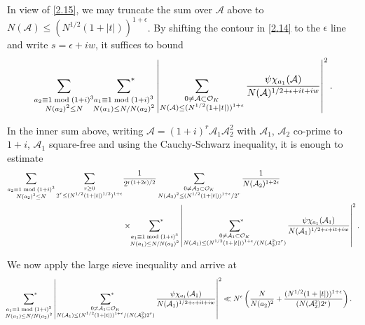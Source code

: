 \documentclass[twoside,leqno,10pt, A4]{amsart}
\begin{document}
     In view of \eqref{2.15}, we may truncate the sum over $\mathcal{A}$ above to $N(\mathcal{A}) \leq (N^{1/2}(1+|t|))^{1+\epsilon}$. By shifting the contour in \eqref{2.14} to the $\epsilon$ line and write $s=\epsilon+iw$, it suffices to bound
\begin{align*}
    \sum_{\substack{a_2 \equiv 1 \bmod {(1+i)^3} \\ N(a_2)^2 \leq N}}\sideset{}{^*}\sum_{\substack{a_1 \equiv 1 \bmod {(1+i)^3} \\ N(a_1) \leq N/N(a_2)^2}} \left| \sum_{\substack {0 \neq \mathcal{A} \subset
  \mathcal{O}_K \\ N(\mathcal{A}) \leq (N^{1/2}(1+|t|))^{1+\epsilon}}}\frac{\psi\chi_{a_1}(\mathcal{A})}{N(\mathcal{A})^{1/2+\epsilon+it+iw}} \right|^2.
\end{align*}

    In the inner sum above, writing $\mathcal{A}=(1+i)^r\mathcal{A}_1\mathcal{A}^2_2$ with $\mathcal{A}_1$, $\mathcal{A}_2$ co-prime to $1+i$, $\mathcal{A}_1$ square-free and using the Cauchy-Schwarz inequality, it is enough to estimate
\begin{align*}
   \sum_{\substack{a_2 \equiv 1 \bmod {(1+i)^3} \\ N(a_2)^2 \leq N}}  \sum_{\substack {r \geq 0\\ 2^r \leq (N^{1/2}(1+|t|)^{1/2})^{1+\epsilon}}} & \frac {1}{2^{r(1+2\epsilon)/2}} \sum_{\substack {0 \neq \mathcal{A}_2 \subset
  \mathcal{O}_K \\ N(\mathcal{A}_2)^2 \leq (N^{1/2}(1+|t|))^{1+\epsilon}/2^r}}\frac{1}{N(\mathcal{A}_2)^{1+2\epsilon}} \\
  &\times \sideset{}{^*}\sum_{\substack{a_1 \equiv 1 \bmod {(1+i)^3} \\ N(a_1) \leq N/N(a_2)^2}} \left| \ \sideset{}{^*}\sum_{\substack {0 \neq \mathcal{A}_1 \subset
  \mathcal{O}_K \\ N(\mathcal{A}_1) \leq (N^{1/2}(1+|t|))^{1+\epsilon}/(N(\mathcal{A}^2_2)2^r)}}\frac{\psi\chi_{a_1}(\mathcal{A}_1)}{N(\mathcal{A}_1)^{1/2+\epsilon+it+iw}} \right|^2.
\end{align*}

   We now apply the large sieve inequality and arrive at
\begin{align*}
  & \sideset{}{^*}\sum_{\substack{a_1 \equiv 1 \bmod {(1+i)^3} \\ N(a_1) \leq N/N(a_2)^2}} \left| \ \sideset{}{^*}\sum_{\substack {0 \neq \mathcal{A}_1 \subset
  \mathcal{O}_K \\ N(\mathcal{A}_1) \leq (N^{1/2}(1+|t|))^{1+\epsilon}/(N(\mathcal{A}^2_2)2^r)}}\frac{\psi\chi_{a_1}(\mathcal{A}_1)}{N(\mathcal{A}_1)^{1/2+\epsilon+it+iw}}\right|^2 \ll N^{\epsilon} \left( \frac {N}{N(a_2)^2}+ \frac {(N^{1/2}(1+|t|))^{1+\epsilon}}{(N(\mathcal{A}^2_2)2^r)} \right).
\end{align*}
\end{document}
